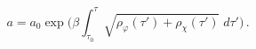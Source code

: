 \begin{equation}                                             \label{25}
  a=a_{0}\exp{\Big(\beta\int_{\tau_{0}}^{\tau}\!\!
    \sqrt{\rho_{\varphi}(\tau')+\rho_{\chi}(\tau')}\;d\tau'\Big)}\,.
\end{equation}

